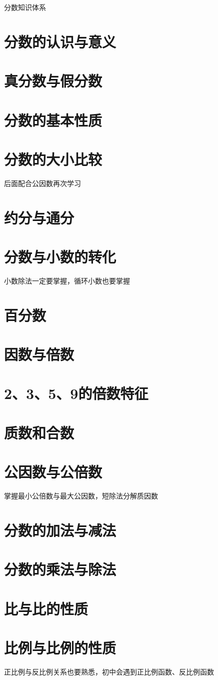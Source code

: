 \setcounter{section}{0} 


\begin{parchmentquote}
    分数知识体系
\end{parchmentquote}






\section{分数的认识与意义}
\section{真分数与假分数}

\section{分数的基本性质}
\section{分数的大小比较}
后面配合公因数再次学习

\section{约分与通分}
\section{分数与小数的转化}
小数除法一定要掌握，循环小数也要掌握
\section{百分数}
\section{因数与倍数}
\section{2、3、5、9的倍数特征}
\section{质数和合数}
\section{公因数与公倍数}
掌握最小公倍数与最大公因数，短除法分解质因数
\section{分数的加法与减法}
\section{分数的乘法与除法}
\section{比与比的性质}
\section{比例与比例的性质}
正比例与反比例关系也要熟悉，初中会遇到正比例函数、反比例函数
\newpage